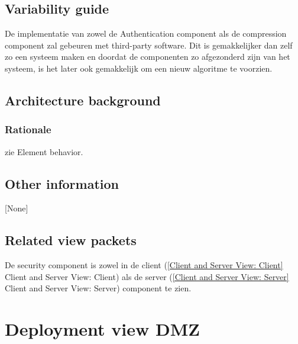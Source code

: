 \documentclass[a4paper,10pt]{article}
\begin{document}
\subsection{Variability guide}
De implementatie van zowel de Authentication component als de compression component zal gebeuren met third-party software. Dit is gemakkelijker dan zelf zo een systeem maken en doordat de componenten zo afgezonderd zijn van het systeem, is het later ook gemakkelijk om een nieuw algoritme te voorzien.\\

\subsection{Architecture background}

\subsubsection{Rationale}
zie Element behavior.


\subsection{Other information}
[None]

\subsection{Related view packets}
De security component is zowel in de client (\ref{Client and Server View: Client} Client and Server View: Client) als de server (\ref{Client and Server View: Server} Client and Server View: Server) component te zien.


\clearpage
\section{Deployment view DMZ}
\end{document}
